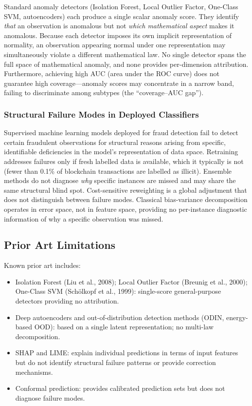 \documentclass[12pt,a4paper]{article}
\begin{document}
Standard anomaly detectors (Isolation Forest, Local Outlier Factor,
One-Class SVM, autoencoders) each produce a single scalar anomaly score.
They identify \emph{that} an observation is anomalous but not
\emph{which mathematical aspect} makes it anomalous. Because each detector
imposes its own implicit representation of normality, an observation
appearing normal under one representation may simultaneously violate a
different mathematical law. No single detector spans the full space of
mathematical anomaly, and none provides per-dimension attribution.
Furthermore, achieving high AUC (area under the ROC curve) does not
guarantee high coverage---anomaly scores may concentrate in a narrow band,
failing to discriminate among subtypes (the ``coverage--AUC gap'').

\subsubsection{Structural Failure Modes in Deployed Classifiers}

Supervised machine learning models deployed for fraud detection fail to
detect certain fraudulent observations for structural reasons arising from
specific, identifiable deficiencies in the model's representation of data
space. Retraining addresses failures only if fresh labelled data is
available, which it typically is not (fewer than 0.1\% of blockchain
transactions are labelled as illicit). Ensemble methods do not diagnose
\emph{why} specific instances are missed and may share the same structural
blind spot. Cost-sensitive reweighting is a global adjustment that does not
distinguish between failure modes. Classical bias-variance decomposition
operates in error space, not in feature space, providing no per-instance
diagnostic information of why a specific observation was missed.

\subsection{Prior Art Limitations}

Known prior art includes:
\begin{itemize}
\item Isolation Forest (Liu et al., 2008); Local Outlier Factor (Breunig
et al., 2000); One-Class SVM (Sch\"{o}lkopf et al., 1999): single-score
general-purpose detectors providing no attribution.
\item Deep autoencoders and out-of-distribution detection methods (ODIN,
energy-based OOD): based on a single latent representation; no multi-law
decomposition.
\item SHAP and LIME: explain individual predictions in terms of input
features but do not identify structural failure patterns or provide
correction mechanisms.
\item Conformal prediction: provides calibrated prediction sets but does not
diagnose failure modes.
\end{itemize}
\end{document}
